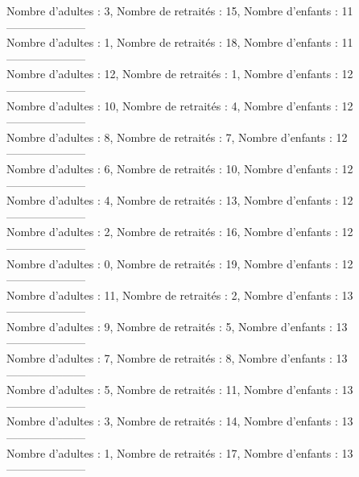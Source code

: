 \documentclass[10pt,a4paper]{article}
\begin{document}
Nombre d'adultes : 3, Nombre de retraités : 15, Nombre d'enfants : 11\\
---------------------\\
Nombre d'adultes : 1, Nombre de retraités : 18, Nombre d'enfants : 11\\
---------------------\\
Nombre d'adultes : 12, Nombre de retraités : 1, Nombre d'enfants : 12\\
---------------------\\
Nombre d'adultes : 10, Nombre de retraités : 4, Nombre d'enfants : 12\\
---------------------\\
Nombre d'adultes : 8, Nombre de retraités : 7, Nombre d'enfants : 12\\
---------------------\\
Nombre d'adultes : 6, Nombre de retraités : 10, Nombre d'enfants : 12\\
---------------------\\
Nombre d'adultes : 4, Nombre de retraités : 13, Nombre d'enfants : 12\\
---------------------\\
Nombre d'adultes : 2, Nombre de retraités : 16, Nombre d'enfants : 12\\
---------------------\\
Nombre d'adultes : 0, Nombre de retraités : 19, Nombre d'enfants : 12\\
---------------------\\
Nombre d'adultes : 11, Nombre de retraités : 2, Nombre d'enfants : 13\\
---------------------\\
Nombre d'adultes : 9, Nombre de retraités : 5, Nombre d'enfants : 13\\
---------------------\\
Nombre d'adultes : 7, Nombre de retraités : 8, Nombre d'enfants : 13\\
---------------------\\
Nombre d'adultes : 5, Nombre de retraités : 11, Nombre d'enfants : 13\\
---------------------\\
Nombre d'adultes : 3, Nombre de retraités : 14, Nombre d'enfants : 13\\
---------------------\\
Nombre d'adultes : 1, Nombre de retraités : 17, Nombre d'enfants : 13\\
---------------------\\
\end{document}
